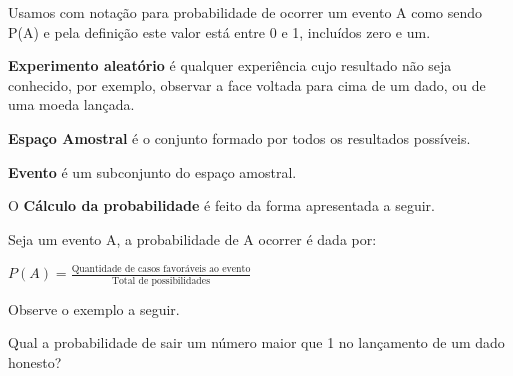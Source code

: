 \begin{escolha}
\begin{boxmedio}
\begin{boxmedio}
{\begin{boxpeq}
\begin{boxpeq}
{\begin{boxpeq}
\begin{boxmedio}
\begin{boxmedio}
\begin{boxpeq}
\begin{boxmedio}
\begin{boxpeq}
\begin{boxpeq}
\begin{boxpeq}
\begin{boxpeq}
\begin{boxmedio}
{\begin{boxmedio}
\begin{boxmedio}
\begin{boxpeq}
\begin{boxmedio}
\begin{boxpeq}
\begin{boxpeq}
\begin{boxpeq}
\begin{escolha}
{\begin{boxmedio}
\begin{boxpeq}
\begin{boxpeq}
\begin{boxpeq}
\begin{boxpeq}
\begin{boxpeq}
\begin{boxmedio}
\begin{boxpeq}
\begin{boxpeq}
\begin{boxpeq}
{\begin{boxpeq}
\begin{boxmedio}
\begin{boxpeq}
\begin{boxpeq}
\begin{boxpeq}
{\begin{boxpeq}
\begin{boxmedio}
{\begin{boxpeq}
\begin{boxpeq}
\begin{boxmedio}
\begin{boxmedio}
\begin{boxpeq}
\begin{boxpeq}
{\begin{boxpeq}
\begin{boxpeq}
\begin{boxpeq}
\begin{boxpeq}
\begin{boxpeq}
\begin{escolha}
\begin{escolha}
{\begin{boxmedio}
\begin{boxpeq}
\begin{q°}
\begin{boxmedio}
\begin{boxpeq}
\begin{boxpeq}
\begin{boxmedio}
\begin{boxmedio}
\begin{boxmedio}
\begin{boxmedio}
{\begin{enumerate}
\begin{boxpeq}
{\begin{boxpeq}
\begin{boxpeq}
\begin{boxmedio}
\begin{boxpeq}
\begin{boxpeq}
\begin{boxpeq}
{\begin{boxpeq}
\begin{boxmedio}
\begin{boxpeq}
{Usamos com notação para probabilidade de ocorrer um evento A como sendo
P(A) e pela definição este valor está entre 0 e 1, incluídos zero e um.

\textbf{Experimento aleatório} é qualquer experiência cujo resultado não
seja conhecido, por exemplo, observar a face voltada para cima de um
dado, ou de uma moeda lançada. 

\textbf{Espaço Amostral} é o conjunto formado por todos os resultados possíveis.

\textbf{Evento} é um subconjunto do espaço amostral.

O \textbf{Cálculo da probabilidade} é feito da forma apresentada a seguir.

Seja um evento A, a probabilidade de A ocorrer é dada por:

$P(A)=\frac{\text{Quantidade de casos favoráveis ao evento}}{\text{Total de possibilidades}}$

Observe o exemplo a seguir.

Qual a probabilidade de sair um número maior que 1 no lançamento de um dado honesto?

}
\end{boxpeq}
\end{boxmedio}
\end{boxpeq}}
\end{boxpeq}
\end{boxpeq}
\end{boxpeq}
\end{boxmedio}
\end{boxpeq}
\end{boxpeq}}
\end{boxpeq}
\end{enumerate}}
\end{boxmedio}
\end{boxmedio}
\end{boxmedio}
\end{boxmedio}
\end{boxpeq}
\end{boxpeq}
\end{boxmedio}
\end{q°}
\end{boxpeq}
\end{boxmedio}}
\end{escolha}
\end{escolha}
\end{boxpeq}
\end{boxpeq}
\end{boxpeq}
\end{boxpeq}
\end{boxpeq}}
\end{boxpeq}
\end{boxpeq}
\end{boxmedio}
\end{boxmedio}
\end{boxpeq}
\end{boxpeq}}
\end{boxmedio}
\end{boxpeq}}
\end{boxpeq}
\end{boxpeq}
\end{boxpeq}
\end{boxmedio}
\end{boxpeq}}
\end{boxpeq}
\end{boxpeq}
\end{boxpeq}
\end{boxmedio}
\end{boxpeq}
\end{boxpeq}
\end{boxpeq}
\end{boxpeq}
\end{boxpeq}
\end{boxmedio}}
\end{escolha}
\end{boxpeq}
\end{boxpeq}
\end{boxpeq}
\end{boxmedio}
\end{boxpeq}
\end{boxmedio}
\end{boxmedio}}
\end{boxmedio}
\end{boxpeq}
\end{boxpeq}
\end{boxpeq}
\end{boxpeq}
\end{boxmedio}
\end{boxpeq}
\end{boxmedio}
\end{boxmedio}
\end{boxpeq}}
\end{boxpeq}
\end{boxpeq}}
\end{boxmedio}
\end{boxmedio}
\end{escolha}
